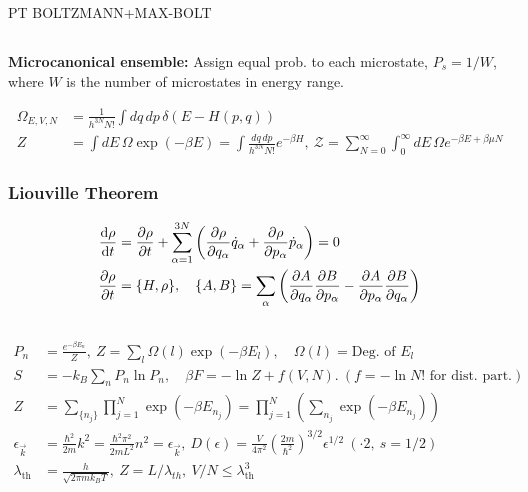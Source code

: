 \documentclass[a4paper, english, 12pt]{article}
\newcommand{\closed}[1]{\left( #1 \right)}
\newcommand{\curly}[1]{\{ #1 \} }
\begin{document}
\begin{multicols*}{2}
PT 
BOLTZMANN+MAX-BOLT 

\subsection*{}

\textbf{Microcanonical ensemble:} Assign equal prob. to each microstate, $P_s=1/W$, where $W$ is the number of microstates in energy range.   

\begin{align*}
    \Omega_{E,V,N} &=\frac{1}{h^{3N}N!}\int dq\,dp\, \delta(E-H(p,q)) \\
    Z &= \int dE\, \Omega \exp(-\beta E) = \int  \frac{dq\, dp}{h^{3N}N!} e^{-\beta H},\: \mathcal{Z} = \sum_{N=0}^\infty \int_0^\infty dE\,\Omega e^{-\beta E + \beta \mu N}
\end{align*}


\subsubsection*{\scriptsize Liouville Theorem}

\begin{align*}
    \dv{\rho}{t} &= \pdv{\rho}{t} + \sum_{\alpha=1}^{3N} \closed{\pdv{\rho}{q_\alpha} \dot{q}_\alpha + \pdv{\rho}{p_\alpha}\dot{p}_\alpha } = 0 \\
    \pdv{\rho}{t} &= \curly{H,\rho},\quad \curly{A,B}=\sum_\alpha \closed{\pdv{A}{q_\alpha}\pdv{B}{p_\alpha} - \pdv{A}{p_\alpha}\pdv{B}{q_\alpha}} 
\end{align*}


\subsection*{}

\begin{align*}
    P_n &= \frac{e^{-\beta E_n}}{Z},\: Z = \sum_l \Omega(l)\exp(-\beta E_l),\quad \Omega(l)=\text{Deg. of }E_l \\
    S &= -k_B \sum_n P_n \ln P_n,\quad \beta F = -\ln Z + f(V,N).\:(f=-\ln N!\text{ for dist. part.}) \\
    Z &= \sum_{\curly{n_j}} \prod_{j=1}^N \exp(-\beta E_{n_j}) = \prod_{j=1}^N \left( \sum_{n_j} \exp(-\beta E_{n_j}) \right) \\
    \epsilon_{\vec{k}} &= \frac{\hbar^2 }{2m}k^2 = \frac{\hbar^2 \pi^2}{2mL^2}n^2 = \epsilon_{\vec{k}},\:D(\epsilon) = \frac{V}{4\pi^2} \left(\frac{2m}{\hbar^2}\right)^{3/2} \epsilon^{1/2}\: (\cdot2,\:s=1/2 ) \\
    \lambda_\mathrm{th} &= \frac{h}{\sqrt{2\pi m k_B T}},\: Z=L/\lambda_{th},\: V/N\leq \lambda_\mathrm{th}^3 
\end{align*}




\end{multicols*}
\end{document}
